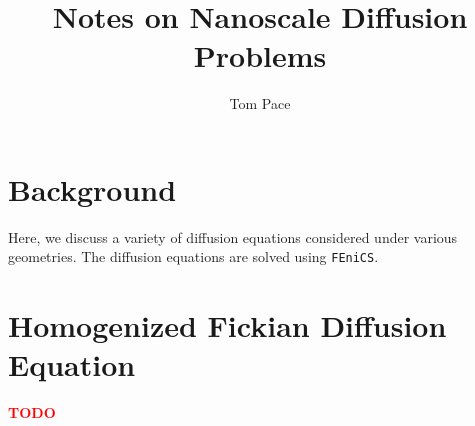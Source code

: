 \documentclass{article}
\begin{document}
\title{Notes on Nanoscale Diffusion Problems}
\author{Tom Pace}
\maketitle

\tableofcontents

\section{Background}\label{sec:background}

Here, we discuss a variety of diffusion equations
considered under various geometries.
The diffusion equations are solved using \texttt{FEniCS}.

















\section{Homogenized Fickian Diffusion Equation}\label{sec:hom_fick}

\textcolor{red}{\textbf{TODO}}

\printbibliography
\end{document}
